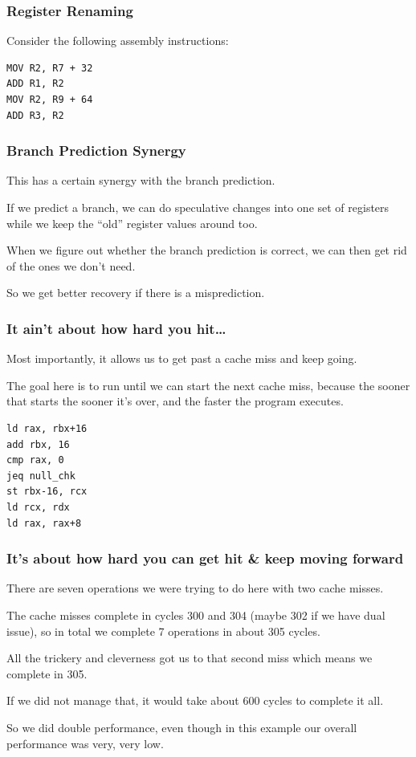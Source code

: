 \begin{frame}[fragile]
\frametitle{Register Renaming}

Consider the following assembly instructions:

\begin{verbatim}
MOV R2, R7 + 32
ADD R1, R2
MOV R2, R9 + 64
ADD R3, R2
\end{verbatim}

\end{frame}




\begin{frame}
\frametitle{Branch Prediction Synergy}

This has a certain synergy with the branch prediction. 

If we predict a branch, we can do speculative changes into one set of registers while we keep the ``old'' register values around too. 

When we figure out whether the branch prediction is correct, we can then get rid of the ones we don't need.

So we get better recovery if there is a misprediction.

\end{frame}



\begin{frame}[fragile]
\frametitle{It ain't about how hard you hit\ldots}

Most importantly, it allows us to get past a cache miss and keep going.

The goal here is to run until we can start the next cache miss, because the sooner that starts the sooner it's over, and the faster the program executes.


\begin{verbatim}
ld rax, rbx+16
add rbx, 16
cmp rax, 0
jeq null_chk
st rbx-16, rcx
ld rcx, rdx
ld rax, rax+8
\end{verbatim}


\end{frame}



\begin{frame}
\frametitle{It's about how hard you can get hit \& keep moving forward}

There are seven operations we were trying to do here with two cache misses. 

The cache misses complete in cycles 300 and 304 (maybe 302 if we have dual issue), so in total we complete 7 operations in about 305 cycles. 

All the trickery and cleverness got us to that second miss which means we complete in 305. 

If we did not manage that, it would take about 600 cycles to complete it all. 

So we did double performance, even though in this example our overall performance was very, very low.

\end{frame}



